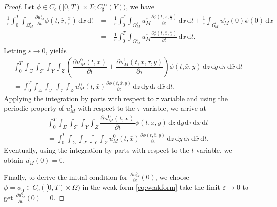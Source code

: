 \documentclass[11pt]{article}
\def\es{\varepsilon}
\def\omm{\Omega_M^\varepsilon}
\def\p{\partial}
\def\mint{\int_{0}^{T}\int_{\Sigma}\int_{\mathcal{T}}\int_{Y}\int_{Z}}
\def\Mint{\int_0^T\int_{\omm}}
\def\dzdy{\di{z}\di{y}\di{\tau}\di{\overline{x}}\di{t}}
\newcommand{\di}[1]{\,\mathrm{d}#1}
\begin{document}
\begin{proof}
Let $\phi\in C_c([0,T)\times \Sigma;C_{\sharp}^\infty(Y))$, we have 
\begin{align*}
    \frac{1}{\es}\Mint\frac{\p u_M^\es}{\p t}\phi(t,\bar x,\frac{x}{\es})\di{x}\di{t}&=- \frac{1}{\es}\Mint u_M^\es\frac{\p \phi(t,\bar x,\frac{x}{\es})}{\p t}\di{x}\di{t}+ \frac{1}{\es}\int_{\omm}u_M^\es(0)\phi(0)\di{x}\\
    &=- \frac{1}{\es}\Mint u_M^\es\frac{\p \phi(t,\bar x,\frac{x}{\es})}{\p t}\di{x}\di{t}.
\end{align*}
Letting $\es\rightarrow 0$, yields
\begin{multline*}
    \mint  \left(\dfrac{\partial u_M^0(t,\bar x)}{\partial t}+ \dfrac{\partial u_M^1(t,\overline{x},\tau,y)}{\partial \tau}\right)\phi(t,\bar x,y)\dzdy\\=\mint u_M^0(t,\bar x)\frac{\p \phi(t,\bar x,y)}{\p t}\dzdy.
\end{multline*}
Applying the integration by parts with respect to $\tau$ variable and using the periodic property of  $u_M^1$ with respect to the $\tau$ variable, we arrive at
\begin{multline*}
    \mint  \dfrac{\partial u_M^0(t,x)}{\partial t}\phi(t,\bar x,y)\dzdy\\=\mint u_M^0(t,\bar x)\frac{\p \phi(t,\bar x,y)}{\p t}\dzdy.
\end{multline*}
Eventually, using the integration by parts with respect to the $t$ variable, we obtain $u_M^0(0)=0$.


Finally, to derive the initial condition for $\frac{\p u_M^0}{\p t}(0)$,  we choose $\phi=\phi_0\in C_c([0,T)\times \Omega)$
in the weak form \eqref{eq:weakform} take the limit $\es\rightarrow 0$  to get $\frac{\p u_M^0}{\p t}(0)=0$.





\end{proof}
\end{document}
